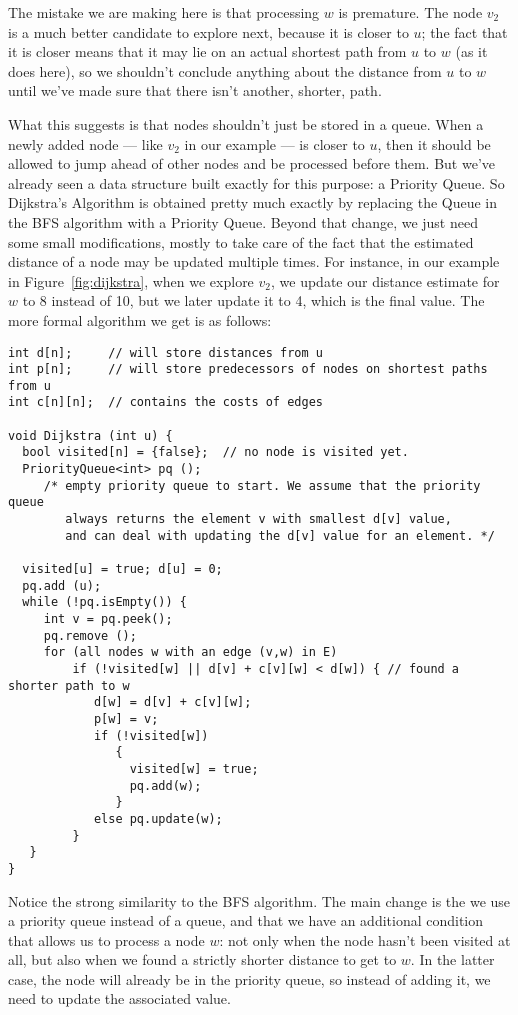 The mistake we are making here is that processing $w$ is
premature. The node $v_2$ is a much better candidate to explore next,
because it is closer to $u$; the fact that it is closer means that it
may lie on an actual shortest path from $u$ to $w$ (as it does here),
so we shouldn't conclude anything about the distance from $u$ to $w$
until we've made sure that there isn't another, shorter, path.

What this suggests is that nodes shouldn't just be stored in a
queue. When a newly added node --- like $v_2$ in our example --- is
closer to $u$, then it should be allowed to jump ahead of other nodes
and be processed before them. But we've already seen a data structure
built exactly for this purpose: a Priority Queue. So Dijkstra's
Algorithm is obtained pretty much exactly by replacing the Queue in
the BFS algorithm with a Priority Queue. Beyond that change, we just
need some small modifications, mostly to take care of the fact that
the estimated distance of a node may be updated multiple times. 
For instance, in our example in Figure~\ref{fig:dijkstra}, when we
explore $v_2$, we update our distance estimate for $w$ to 8 instead of
10, but we later update it to 4, which is the final value.
The more formal algorithm we get is as follows:

\begin{verbatim}
int d[n];     // will store distances from u
int p[n];     // will store predecessors of nodes on shortest paths from u
int c[n][n];  // contains the costs of edges

void Dijkstra (int u) {
  bool visited[n] = {false};  // no node is visited yet.
  PriorityQueue<int> pq ();  
     /* empty priority queue to start. We assume that the priority queue
        always returns the element v with smallest d[v] value, 
        and can deal with updating the d[v] value for an element. */

  visited[u] = true; d[u] = 0;
  pq.add (u);
  while (!pq.isEmpty()) {
     int v = pq.peek();
     pq.remove ();
     for (all nodes w with an edge (v,w) in E) 
         if (!visited[w] || d[v] + c[v][w] < d[w]) { // found a shorter path to w
            d[w] = d[v] + c[v][w];
            p[w] = v;
            if (!visited[w]) 
               {
                 visited[w] = true;
                 pq.add(w);
               }
            else pq.update(w);
         }
   }
}
\end{verbatim}
Notice the strong similarity to the BFS algorithm.
The main change is the we use a priority queue instead of a queue, and
that we have an additional condition that allows us to process a node
$w$: not only when the node hasn't been visited at all, but also when
we found a strictly shorter distance to get to $w$.
In the latter case, the node will already be in the priority queue, so
instead of adding it, we need to update the associated value.

